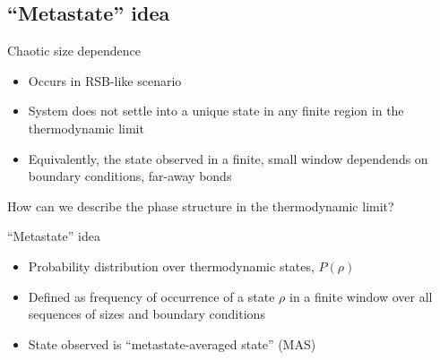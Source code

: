 \documentclass{beamer}
\begin{document}
\subsection{``Metastate'' idea}

\begin{frame}{Chaotic size dependence}
  \begin{itemize}
    \item Occurs in RSB-like scenario \autocite{newman1992multiple}
    \item
      \alert{System does not settle into a unique
        state in any finite region in the thermodynamic limit}
    \item Equivalently, the state observed in a finite, small window dependends
      on boundary conditions, far-away bonds
  \end{itemize}
  \begin{figure}
  \end{figure}
  \alert{How can we describe the phase structure in the thermodynamic limit?}
\end{frame}

\begin{frame}{``Metastate'' idea}
  \begin{itemize}
    \item Probability distribution over thermodynamic states, $P(\rho)$
      \autocite{newman1997metastate}
    \item Defined as frequency of occurrence of a state $\rho$ in a finite
      window over all sequences of sizes and boundary conditions
    \item State observed is ``metastate-averaged state'' (MAS)
  \end{itemize}
  \begin{figure}
  \end{figure}
\end{frame}
\end{document}
